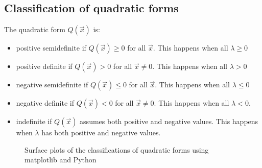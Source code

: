 \documentclass[11pt, a4paper]{article}
\begin{document}
\subsection{Classification of quadratic forms}
The quadratic form $Q(\vec{x})$ is:
\begin{itemize}
  \item positive semidefinite if $Q(\vec{x}) \geq 0$ for all $\vec{x}$. This happens when all $\lambda \geq 0$
  \item positive definite if $Q(\vec{x}) > 0$ for all $\vec{x} \neq 0$. This happens when all $\lambda > 0$
  \item negative semidefinite if $Q(\vec{x}) \leq 0$ for all $\vec{x}$. This happens when all $\lambda \leq 0$
  \item negative definite if $Q(\vec{x}) < 0$ for all $\vec{x} \neq 0$. This happens when all $\lambda < 0$.
  \item indefinite if $Q(\vec{x})$ assumes both positive and negative values. This happens when $\lambda$ has both positive and negative values. 
\end{itemize}
\begin{figure}[h]
  \centering
  \qquad
  \qquad
  \caption{Surface plots of the classifications of quadratic forms using matplotlib and Python}
\end{figure}
\end{document}
